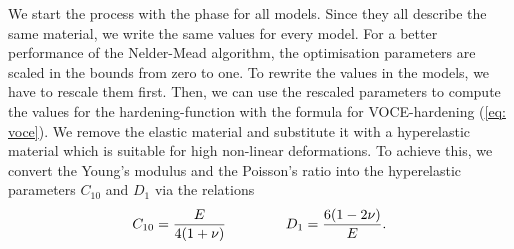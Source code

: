 \indent We start the process with the phase  for all models.
Since they all describe the same material, we write the same values for every model.
For a better performance of the Nelder-Mead algorithm, the optimisation parameters are scaled in the bounds from zero to one.
To rewrite the values in the models, we have to rescale them first.
Then, we can use the rescaled parameters to compute the values for the hardening-function with the formula for VOCE-hardening (\autoref{eq: voce}).
We remove the elastic material and substitute it with a hyperelastic material which is suitable for high non-linear deformations.
To achieve this, we convert the Young's modulus and the Poisson's ratio into the hyperelastic parameters $C_{10}$ and $D_1$ via the relations
\begin{gather}\label{eq: elasticParams}
    C_{10} = \frac{E}{4(1+ \nu)} \hspace{1.5cm}
    D_1 = \frac{6(1-2\nu)}{E}.
\end{gather}

